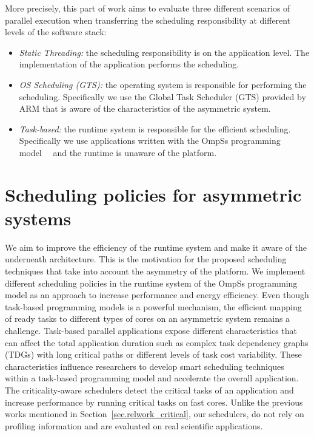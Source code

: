 More precisely, this part of work aims to evaluate three different scenarios of parallel execution when transferring the scheduling responsibility at different levels of the software stack:
\begin{itemize}
\item \textit{Static Threading:} the scheduling responsibility is on the application level. The implementation of the application performs the scheduling.
\item \textit{OS Scheduling (GTS):} the operating system is responsible for performing the scheduling. Specifically we use the Global Task Scheduler (GTS) provided by ARM that is aware of the characteristics of the asymmetric system.
\item \textit{Task-based:} the runtime system is responsible for the efficient scheduling. Specifically we use applications written with the OmpSs programming model~\cite{OmpSs_PPL11}~\cite{OmpSs} and the runtime is unaware of the platform.
\end{itemize}


\section{Scheduling policies for asymmetric systems}
\label{sec:scheduling}
We aim to improve the efficiency of the runtime system and make it aware of the underneath architecture.
This is the motivation for the proposed scheduling techniques that take into account the asymmetry of the platform.
We implement different scheduling policies in the runtime system of the OmpSs programming model as an approach to increase performance and energy efficiency.
Even though task-based programming models is a powerful mechanism, the efficient mapping of ready tasks to different types of cores on an asymmetric system remains a challenge.
Task-based parallel applications expose different characteristics that can affect the total application duration such as complex task dependency graphs (TDGs) with long critical paths or different levels of task cost variability.
These characteristics influence researchers to develop smart scheduling techniques within a task-based programming model and accelerate the overall application.
The criticality-aware schedulers detect the critical tasks of an application and increase performance by running critical tasks on fast cores. 
Unlike the previous works mentioned in Section~\ref{sec.relwork_critical}, our schedulers, do not rely on profiling information and are evaluated on real scientific applications.

